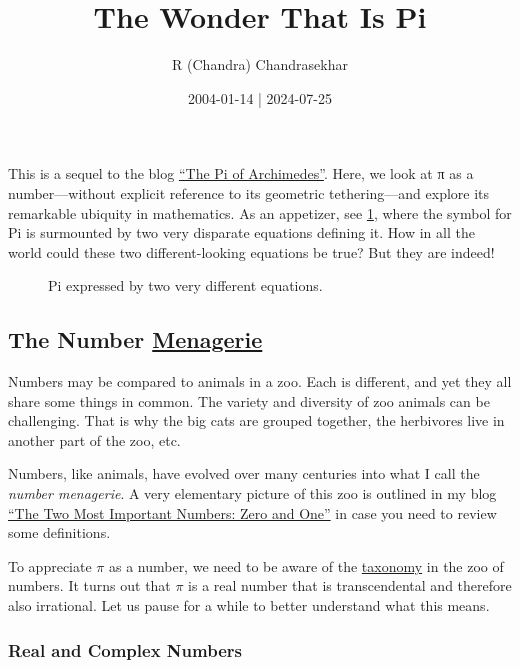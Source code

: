 \documentclass[
  a4paper,
]{article}
\title{The Wonder That Is Pi}
\author{R (Chandra) Chandrasekhar}
\date{2004-01-14 | 2024-07-25}
\begin{document}
\maketitle

\thispagestyle{empty}


This is a sequel to the blog
\href{https://swanlotus.netlify.app/blogs/the-pi-of-archimedes}{``The Pi
of Archimedes''}. Here, we look at π as a number---without explicit
reference to its geometric tethering---and explore its remarkable
ubiquity in mathematics. As an appetizer, see \cref{fig:pi-equations},
where the symbol for Pi is surmounted by two very disparate equations
defining it. How in all the world could these two different-looking
equations be true? But they are indeed!

\begin{figure}
\centering

\caption{Pi expressed by two very different
equations.}\label{fig:pi-equations}
\end{figure}

\subsection{\texorpdfstring{The Number
\href{https://www.thefreedictionary.com/menagerie}{Menagerie}}{The Number Menagerie}}\label{the-number-menagerie}

Numbers may be compared to animals in a zoo. Each is different, and yet
they all share some things in common. The variety and diversity of zoo
animals can be challenging. That is why the big cats are grouped
together, the herbivores live in another part of the zoo, etc.

Numbers, like animals, have evolved over many centuries into what I call
the \emph{number menagerie}. A very elementary picture of this zoo is
outlined in my blog
\href{https://swanlotus.netlify.app/blogs/the-two-most-important-numbers-zero-and-one}{``The
Two Most Important Numbers: Zero and One''} in case you need to review
some definitions.

To appreciate \(\pi\) as a number, we need to be aware of the
\hyperref[taxonomy]{taxonomy} in the zoo of numbers. It turns out that
\(\pi\) is a real number that is transcendental and therefore also
irrational. Let us pause for a while to better understand what this
means.

\subsubsection{Real and Complex Numbers}\label{real-and-complex-numbers}
\end{document}
